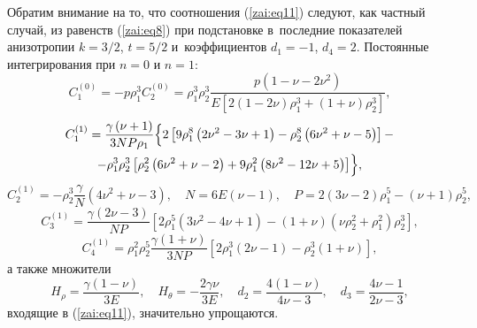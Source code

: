 Обратим внимание на то, что соотношения (\ref{zai:eq11}) следуют, как частный случай, из равенств (\ref{zai:eq8}) при подстановке в~последние
показателей анизотропии $k = 3/ 2$, $t = 5 / 2$ и~коэффициентов $d_1 = - 1$, $d_4 = 2$. Постоянные интегрирования при
$n = 0$ и $n = 1$:
$$
C^{(0)}_{1} = - p\rho_1^3 C^{(0)}_{2} =
\rho_1^3 \rho_2^3 \frac{p \left({ 1 - \nu - 2\nu^2} \right)}{E\left[
{2\left( {1 - 2\nu } \right)\rho_1^3 + \left( {1 + \nu }
\right)\rho_2^3 } \right]},
$$
\begin{multline*}
 C_1^{(1)} = \frac{\gamma \left( {\nu + 1} \right)}{3NP\rho _1}
 \Bigl\{ 2\left[ {9\rho _1^8 \left( {2\nu ^2 - 3\nu + 1} \right) -
\rho
_2^8 \left( {6\nu ^2 + \nu - 5} \right)} \right] - \\
 - \rho _1^3 \rho _2^3 \left[ {\rho _2^2 \left( {6\nu ^2 + \nu - 2}
\right) + 9\rho _1^2 \left( {8\nu ^2 - 12\nu + 5} \right)} \right]
\Bigr\} ,
\end{multline*}
$$
C_2^{(1)} = - \rho _2^3 \frac{\gamma }{N}\left( {4\nu
^2 + \nu - 3} \right), \quad N = 6E\left( {\nu - 1} \right), \quad P
= 2\left( {3\nu - 2} \right)\rho _1^5 - \left( {\nu + 1} \right)\rho
_2^5 ,
$$
$$
C_3^{(1)} = \frac{\gamma \left( {2\nu - 3}
\right)}{NP}\left[ {2\rho _1^5 \left( {3\nu ^2 - 4\nu + 1} \right) -
\left( {1 + \nu } \right)\left( {\nu \rho _2^2 + \rho _1^2 }
\right)\rho _2^3 } \right],
$$
$$
C_4^{(1)} = \rho _1^2 \rho _2^5 \frac{\gamma \left( {1
+ \nu } \right)}{3NP}\left[ {2\rho _1^3 \left( {2\nu - 1} \right) -
\rho _2^3 \left( {1 + \nu } \right)} \right],
$$
\noindent а также множители
$$
H_\rho = \frac{\gamma \left( {1 - \nu } \right)}{3E}, \quad H_\theta
= - \frac{2\gamma \nu }{3E}, \quad d_2 = \frac{4\left( {1 - \nu }
\right)}{4\nu - 3}, \quad d_3 = \frac{4\nu - 1}{2\nu - 3},
$$
\noindent входящие в (\ref{zai:eq11}), значительно упрощаются.

